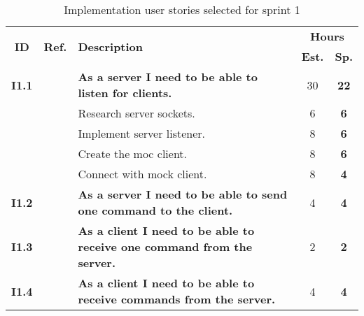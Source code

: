 \begin{table*}
\def\arraystretch{1.25}
\label{tab:sprint1stories}
\caption{Implementation user stories selected for sprint 1}
\begin{tabularx}{\textwidth}{ccXcc}
\toprule[0.5mm]
\multirow{2}{*}{\textbf{ID}} &
\multirow{2}{*}{\textbf{Ref.}} & \multirow{2}{*}{\textbf{Description}} & \multicolumn{2}{c}{\textbf{Hours}} \\
 					& & & \textbf{Est.} & \textbf{Sp.} \\
\midrule

	
\textbf{I1.1} 	& {C1}	& {\bf As a server I need to be able to listen for clients.} 							& 	30	& \textbf{22} \\
				&& Research server sockets.		& 6 & \textbf{6} \\
				&& Implement server listener.	& 8 & \textbf{6} \\
				&& Create the moc client. 		& 8 & \textbf{6}  \\
				&& Connect with mock client.	& 8 & \textbf{4}  \\
	
\textbf{I1.2} 	& {M6}	& {\bf As a server I need to be able to send one command to the client. } 				& 	4	& \textbf{4} \\

\textbf{I1.3} 	& {M6}	& {\bf As a client I need to be able to receive one command from the server. } 			& 	2	& \textbf{2} \\

\textbf{I1.4} 	& {M6}	& {\bf As a client I need to be able to receive commands from the server.} 				& 	4	& \textbf{4} \\


\end{tabularx}
\end{table*}
